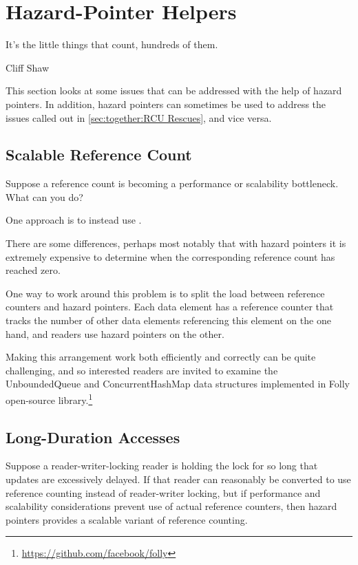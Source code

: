 
\section{Hazard-Pointer Helpers}
\label{sec:together:Hazard-Pointer Helpers}
%
\epigraph{It's the little things that count, hundreds of them.}
	 {Cliff Shaw}

This section looks at some issues that can be addressed with the
help of hazard pointers.
In addition, hazard pointers can sometimes be used to address the
issues called out in \cref{sec:together:RCU Rescues}, and vice versa.

\subsection{Scalable Reference Count}
\label{sec:together:Scalable Reference Count}

Suppose a reference count is becoming a performance or scalability
bottleneck.
What can you do?

One approach is to instead use .

There are some differences, perhaps most notably that with
hazard pointers it is extremely expensive to determine when
the corresponding reference count has reached zero.

One way to work around this problem is to split the load between
reference counters and hazard pointers.
Each data element has a reference counter that tracks the number
of other data elements referencing this element on the one hand,
and readers use hazard pointers on the other.

Making this arrangement work both efficiently and correctly can be
quite challenging, and so interested readers are invited to examine
the UnboundedQueue and ConcurrentHashMap data structures implemented in
Folly open-source library.\footnote{
	\url{https://github.com/facebook/folly}}

\subsection{Long-Duration Accesses}
\label{sec:together:Long-Duration Accesses}

Suppose a reader-writer-locking reader is holding the lock for so
long that updates are excessively delayed.
If that reader can reasonably be converted to use reference counting
instead of reader-writer locking, but if performance and scalability
considerations prevent use of actual reference counters, then hazard
pointers provides a scalable variant of reference counting.

